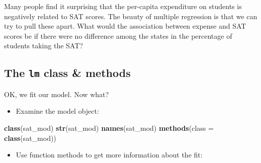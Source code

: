 \documentclass[
]{book}
\newenvironment{Shaded}{\begin{snugshade}}{\end{snugshade}}
\newcommand{\DataTypeTok}[1]{\textcolor[rgb]{0.13,0.29,0.53}{#1}}
\newcommand{\DecValTok}[1]{\textcolor[rgb]{0.00,0.00,0.81}{#1}}
\newcommand{\KeywordTok}[1]{\textcolor[rgb]{0.13,0.29,0.53}{\textbf{#1}}}
\newcommand{\NormalTok}[1]{#1}
\newcommand{\OperatorTok}[1]{\textcolor[rgb]{0.81,0.36,0.00}{\textbf{#1}}}
\newcommand{\StringTok}[1]{\textcolor[rgb]{0.31,0.60,0.02}{#1}}
\providecommand{\tightlist}{%
  \setlength{\itemsep}{0pt}\setlength{\parskip}{0pt}}
\begin{document}
Many people find it surprising that the per-capita expenditure on students is negatively related to SAT scores. The beauty of multiple regression is that we can try to pull these apart. What would the association between expense and SAT scores be if there were no difference among the states in the percentage of students taking the SAT?

\begin{Shaded}
\end{Shaded}

\hypertarget{the-lm-class-methods}{%
\subsection{\texorpdfstring{The \texttt{lm} class \& methods}{The lm class \& methods}}\label{the-lm-class-methods}}

OK, we fit our model. Now what?

\begin{itemize}
\tightlist
\item
  Examine the model object:
\end{itemize}

\begin{Shaded}
\begin{Highlighting}[]
  \KeywordTok{class}\NormalTok{(sat_mod)}
  \KeywordTok{str}\NormalTok{(sat_mod)}
  \KeywordTok{names}\NormalTok{(sat_mod)}
  \KeywordTok{methods}\NormalTok{(}\DataTypeTok{class =} \KeywordTok{class}\NormalTok{(sat_mod))}
\end{Highlighting}
\end{Shaded}

\begin{itemize}
\tightlist
\item
  Use function methods to get more information about the fit:
\end{itemize}

\begin{Shaded}
\end{Shaded}
\end{document}
